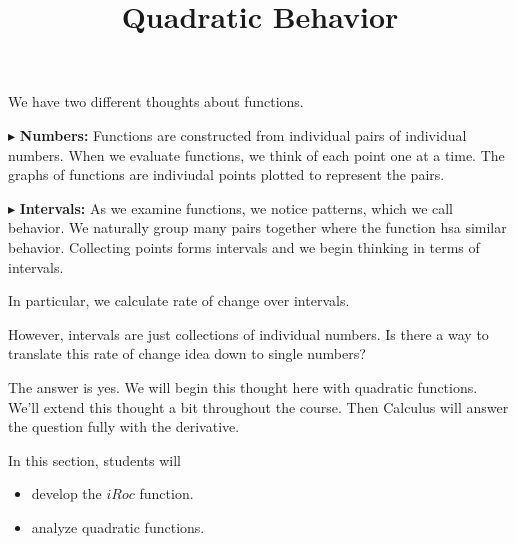 \documentclass{ximera}
\title{Quadratic Behavior}
\begin{document}
\begin{abstract}
\end{abstract}
\maketitle







We have two different thoughts about functions.


$\blacktriangleright$ \textbf{Numbers:}  Functions are constructed from individual pairs of individual numbers.  When we evaluate functions, we think of each point one at a time.  The graphs of functions are indiviudal points plotted to represent the pairs. 







$\blacktriangleright$ \textbf{Intervals:} As we examine functions, we notice patterns, which we call behavior. We naturally group many pairs together where the function hsa similar behavior.  Collecting points forms intervals and we begin thinking in terms of intervals.





In particular, we calculate rate of change over intervals. 


However, intervals are just collections of individual numbers.  Is there a way to translate this rate of change idea down to single numbers?

The answer is yes.  We will begin this thought here with quadratic functions. We'll extend this thought a bit throughout the course. Then Calculus will answer the question fully with the derivative.















\begin{sectionOutcomes}
In this section, students will 

\begin{itemize}
\item develop the $iRoc$ function.
\item analyze quadratic functions.
\end{itemize}
\end{sectionOutcomes}
\end{document}
